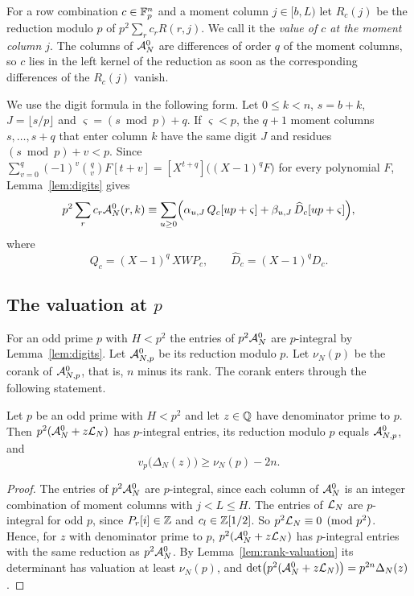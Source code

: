 For a row combination $c\in\mathbb F_p^n$ and a moment column $j\in[b,L)$ let $R_c(j)$ be the reduction modulo
$p$ of $p^2\sum_rc_rR(r,j)$. We call it the \emph{value of $c$ at the moment column $j$}. The columns of
$\mathcal A^0_N$ are differences of order $q$ of the moment columns, so $c$ lies in the left kernel of the
reduction as soon as the corresponding differences of the $R_c(j)$ vanish.

We use the digit formula in the following form. Let $0\le k<n$, $s=b+k$, $J=\lfloor s/p\rfloor$ and
$\varsigma=(s\bmod p)+q$. If $\varsigma<p$, the $q+1$ moment columns $s,\dots,s+q$ that enter column $k$ have
the same digit $J$ and residues $(s\bmod p)+v<p$. Since
$\sum_{v=0}^q(-1)^v\binom qvF[t+v]=[X^{t+q}]\bigl((X-1)^qF\bigr)$ for every polynomial $F$,
Lemma~\ref{lem:digits} gives
\begin{equation}\label{eq:column-digits}
 p^2\sum_rc_r\mathcal A^0_N(r,k)\equiv\sum_{u\ge0}\Bigl(\alpha_{u,J}\,Q_c[up+\varsigma]+\beta_{u,J}\,\widehat D_c[up+\varsigma]\Bigr),
\end{equation}
where
\begin{equation}\label{eq:Qc}
 Q_c=(X-1)^q\,XWP_c,\qquad \widehat D_c=(X-1)^qD_c .
\end{equation}

\subsection{The valuation at $p$}
For an odd prime $p$ with $H<p^2$ the entries of $p^2\mathcal A^0_N$ are $p$-integral by Lemma~\ref{lem:digits}.
Let $\mathcal A^0_{N,p}$ be its reduction modulo $p$. Let $\nu_N(p)$ be the corank of $\mathcal A^0_{N,p}$, that is, $n$
minus its rank. The corank enters through the following statement.

\begin{proposition}\label{prop:valuation}
Let $p$ be an odd prime with $H<p^2$ and let $z\in\mathbb Q$ have denominator prime to $p$. Then
$p^2(\mathcal A^0_N+z\mathcal L_N)$ has $p$-integral entries, its reduction modulo $p$ equals $\mathcal A^0_{N,p}$, and
\[
 v_p\bigl(\Delta_N(z)\bigr)\ge\nu_N(p)-2n .
\]
\end{proposition}

\begin{proof}
The entries of $p^2\mathcal A^0_N$ are $p$-integral, since each column of $\mathcal A^0_N$ is an integer combination of
moment columns with $j<L\le H$. The entries of $\mathcal L_N$ are $p$-integral for odd $p$, since $P_r[i]\in\mathbb Z$
and $c_l\in\mathbb Z[1/2]$. So $p^2\mathcal L_N\equiv0\pmod{p^2}$. Hence, for $z$ with denominator prime to $p$,
$p^2(\mathcal A^0_N+z\mathcal L_N)$ has $p$-integral entries with the same reduction as $p^2\mathcal A^0_N$. By
Lemma~\ref{lem:rank-valuation} its determinant has valuation at least $\nu_N(p)$, and
$\det\bigl(p^2(\mathcal A^0_N+z\mathcal L_N)\bigr)=p^{2n}\Delta_N(z)$.
\end{proof}

